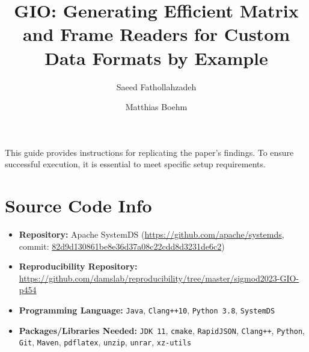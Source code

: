 \documentclass[acmsmall,screen,pdfa]{acmart}
\begin{document}

\title[GIO: Generating Efficient Matrix and Frame Readers for Custom Data Formats by Example]{GIO: Generating Efficient Matrix and Frame Readers for Custom Data Formats by Example\cite{GIO}}

\author{Saeed Fathollahzadeh} 

\author{Matthias Boehm} 

\renewcommand{\shortauthors}{Saeed Fathollahzadeh \& Matthias Boehm}

\maketitle

This guide provides instructions for replicating the paper's findings. To ensure successful execution, it is essential to meet specific setup requirements.

\section{Source Code Info}
\begin{itemize}
  \item \textbf{Repository:} Apache SystemDS (\url{https://github.com/apache/systemds},\\ commit: \hyperlink{https://github.com/apache/systemds/commit/82d9d130861be8e36d37a08c22cdd8d3231de6c2}{82d9d130861be8e36d37a08c22cdd8d3231de6c2})
  \item \textbf{Reproducibility Repository:} \url{https://github.com/damslab/reproducibility/tree/master/sigmod2023-GIO-p454}
  \item \textbf{Programming Language:} \texttt{Java}, \texttt{Clang++10}, \texttt{Python 3.8}, \texttt{SystemDS} 
  \item \textbf{Packages/Libraries Needed:} \texttt{JDK 11}, \texttt{cmake}, \texttt{RapidJSON}, \texttt{Clang++}, \texttt{Python}, \texttt{Git}, \texttt{Maven}, \texttt{pdflatex}, \texttt{unzip}, \texttt{unrar}, \texttt{xz-utils}
\end{itemize}  
\end{document}
